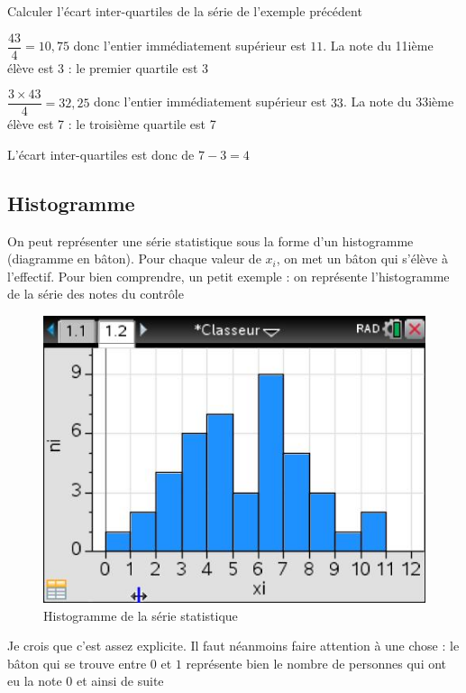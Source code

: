 \newline

\begin{exemple}
Calculer l'écart inter-quartiles de la série de l'exemple précédent\newline

$\dfrac{43}{4} = 10,75$ donc l'entier immédiatement supérieur est $11$. La note du 11ième élève est 3 : le premier quartile est 3\newline

$\dfrac{3\times 43}{4} = 32,25$ donc l'entier immédiatement supérieur est $33$. La note du 33ième élève est 7 : le troisième quartile est 7\newline
 
L'écart inter-quartiles est donc de $7-3 = 4$
\end{exemple}
\subsection{Histogramme}
On peut représenter une série statistique sous la forme d'un histogramme (diagramme en bâton). Pour chaque valeur de $x_i$, on met un bâton qui s'élève à l'effectif. Pour bien comprendre, un petit exemple : on représente l'histogramme de la série des notes du contrôle 
\begin{figure}[H]
\centering
\includegraphics[scale=0.5]{images/histo.jpg}
\caption{Histogramme de la série statistique}
\end{figure}
Je crois que c'est assez explicite. Il faut néanmoins faire attention à une chose : le bâton qui se trouve entre $0$ et $1$ représente bien le nombre de personnes qui ont eu la note $0$ et ainsi de suite
